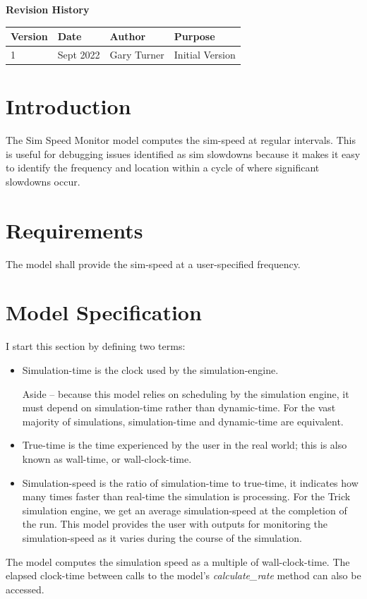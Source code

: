 \documentclass[11pt,fleqn]{report}
\begin{document}
\titlePage
\clearpage %
\tableofcontents %
\vfill
{\Large \textbf {Revision History}}
{\large
\begin{center}
\begin{tabular}{|l||l|l|l|}
\hline
 \textbf{Version} & \textbf{Date} & \textbf{Author} & \textbf{Purpose} \\ \hline
 \hline
1 & Sept 2022 & Gary Turner & Initial Version \\ \hline
\end{tabular}
\end{center}
}

\chapter{Introduction} %
The Sim Speed Monitor model computes the sim-speed at regular intervals.
This is useful for debugging issues identified as sim slowdowns because it
makes it easy to identify the frequency and location within a cycle of where
significant slowdowns occur.

\chapter {Requirements}
The model shall provide the sim-speed at a user-specified frequency.

\chapter {Model Specification}
I start this section by defining two terms:
\begin{itemize}
\item Simulation-time is the clock used by the simulation-engine.

  Aside -- because this model relies on scheduling by the simulation engine,
  it must depend on simulation-time rather than dynamic-time.
  For the vast majority of simulations, simulation-time and dynamic-time are
  equivalent.
\item True-time is the time experienced by the user in the real world; this is
  also known as wall-time, or wall-clock-time.
\item Simulation-speed is the ratio of simulation-time to true-time, it
  indicates how many times faster than real-time the simulation is processing.
  For the Trick simulation engine, we get an average simulation-speed at the
  completion of the run. This model provides the user with outputs for
  monitoring the simulation-speed as it varies during the course of the
  simulation.
\end{itemize}
The model computes the simulation speed as a multiple of wall-clock-time.
The elapsed clock-time between calls to the model's \textit{calculate\_rate}
method can also be accessed.
\end{document}
